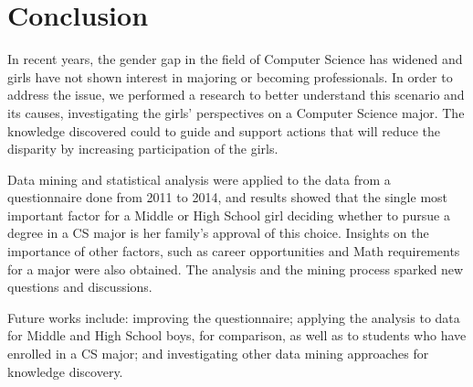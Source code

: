 \section{Conclusion}\label{sec:conclusion}%

In recent years, the gender gap in the field of Computer Science has widened and girls have not shown interest in majoring or becoming professionals. In order to address the issue, we performed a research to better understand this scenario and its causes, investigating the girls' perspectives on a Computer Science major. The knowledge discovered could to guide and support actions that will reduce the disparity by increasing participation of the girls.

Data mining and statistical analysis were applied to the data from a questionnaire done from 2011 to 2014, and results showed that the single most important factor for a Middle or High School girl deciding whether to pursue a degree in a CS major is her family's approval of this choice. Insights on the importance of other factors, such as career opportunities and Math requirements for a major were also obtained. The analysis and the mining process sparked new questions and discussions.

Future works include: improving the questionnaire; applying the analysis to data for Middle and High School boys, for comparison, as well as to students who have enrolled in a CS major; and investigating other data mining approaches for knowledge discovery.
